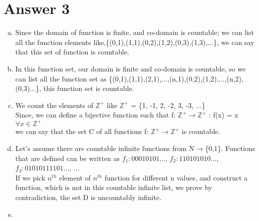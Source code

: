 \documentclass[11pt]{article}
\begin{document}
\section*{Answer 3}
    \begin{enumerate}[(a)]
        \item Since the domain of function is finite, and co-domain is countable; we can list all the function elements like,\{(0,1),(1,1),(0,2),(1,2),(0,3),(1,3),...\}, we can say that this set of function is countable.
        \item In this function set, our domain is finite and co-domain is countable, so we can list all the function set as \{(0,1),(1,1),(2,1),...,(n,1),(0,2),(1,2),...,(n,2),(0,3)...\}, this function set is countable.
        \item We count the elements of $\mathbb{Z}^+$ like $\mathbb{Z}^+$ = \{1, -1, 2, -2, 3, -3, ...\}\\
        Since, we can define a bijective function such that f: $\mathbb{Z}^+\rightarrow \mathbb{Z}^+$ : f(x) = x $\forall x\in\mathbb{Z}^+$\\
        we can say that the set C of all functions f: $\mathbb{Z}^+\rightarrow \mathbb{Z}^+$ is countable.
        
        \item Let's assume there are countable infinite functions from N$\rightarrow$\{0,1\}. Functions that are defined can be written as $f_1 : 00010101...$, $f_2 : 110101010...$, $f_3 : 01010111101...$, ...\\
        If we pick $n^{th}$ element of $n^{th}$ function for different n values, and construct a function, which is not in this countable infinite list, we prove by contradiction, the set D is uncountably infinite.
        \item
    \end{enumerate}
\end{document}
